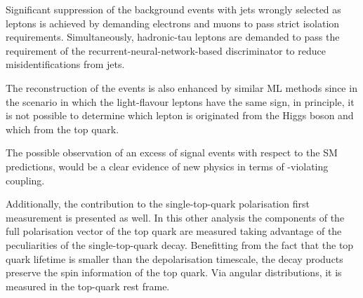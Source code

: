 Significant suppression of the background events with jets wrongly selected as leptons 
is achieved by demanding electrons and muons to pass strict isolation requirements. 
Simultaneously, hadronic-tau leptons are demanded to pass the requirement of the
recurrent-neural-network-based discriminator to reduce misidentifications from jets.

The reconstruction of the events is also enhanced by similar ML methods
since in the scenario in which the light-flavour leptons have the same sign, in principle, it is not
possible to determine which lepton is originated from the Higgs boson and which from the
top quark.

The possible observation of an excess of signal events with respect to the SM predictions, 
would be a clear evidence of new physics in terms of \CP-violating \yt coupling.


Additionally, the contribution to the single-top-quark polarisation first measurement is presented as well. 
In this other analysis the components of the full polarisation vector of the top quark are measured
taking advantage of the peculiarities of the single-top-quark decay. Benefitting from the fact that
the top quark lifetime is smaller than the depolarisation timescale, the decay products preserve
the spin information of the top quark. Via angular distributions, it is measured in the top-quark rest
frame. 









